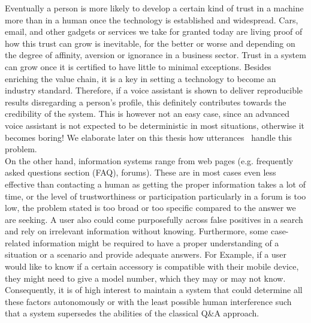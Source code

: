 Eventually a person is more likely to develop a certain kind of trust in a machine more than in a human once the technology is established and widespread.
Cars, email, and other gadgets or services we take for granted today are living proof of how this trust can grow is inevitable, for the better or worse and depending on the degree of affinity, aversion or ignorance in a business sector.
Trust in a system can grow once it is certified to have little to minimal exceptions. Besides enriching the value chain, it is a key in setting a technology to become an industry standard.
Therefore, if a voice assistant is shown to deliver reproducible results disregarding a person's profile, this definitely contributes towards the credibility of the system.
This is however not an easy case, since an advanced voice assistant is not expected to be deterministic in most situations, otherwise it becomes boring! We elaborate later on this thesis how utterances~\tocite{} handle this problem.\\


On the other hand, information systems range from web pages (e.g. frequently asked questions section (FAQ), forums). These are in most cases even less effective than contacting a human as getting the proper information takes a lot of time, or the level of trustworthiness or participation particularly in a forum is too low, the problem stated is too broad or too specific compared to the answer we are seeking. A user also could come purposefully across false positives in a search and rely on irrelevant information without knowing.
Furthermore, some case-related information might be required to have a proper understanding of a situation or a scenario and provide adequate answers. For Example, if a user would like to know if a certain accessory is compatible with their mobile device, they might need to give a model number, which they may or may not know.
Consequently, it is of high interest to maintain a system that could determine all these factors autonomously or with the least possible human interference such that a system supersedes the abilities of the classical Q\&A approach.\\


